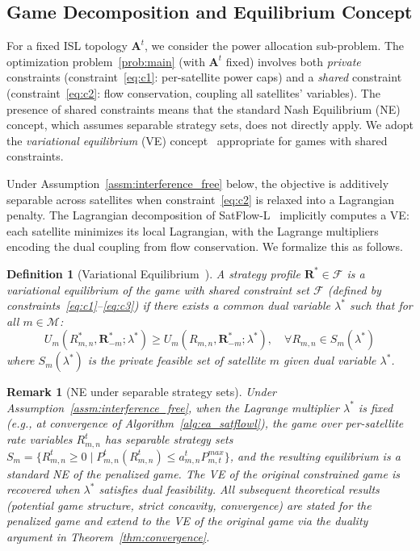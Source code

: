 \documentclass[journal]{IEEEtran}
\newtheorem{definition}{Definition}
\newtheorem{remark}{Remark}
\newcommand{\calM}{\mathcal{M}}
\newcommand{\bfR}{\mathbf{R}}
\newcommand{\Rmn}{R_{m,n}^{t}}
\begin{document}
\subsection{Game Decomposition and Equilibrium Concept}

For a fixed ISL topology $\mathbf{A}^t$, we consider the power allocation sub-problem. The optimization problem~\eqref{prob:main} (with $\mathbf{A}^t$ fixed) involves both \emph{private} constraints (constraint~\eqref{eq:c1}: per-satellite power caps) and a \emph{shared} constraint (constraint~\eqref{eq:c2}: flow conservation, coupling all satellites' variables). The presence of shared constraints means that the standard Nash Equilibrium (NE) concept, which assumes separable strategy sets, does not directly apply. We adopt the \emph{variational equilibrium} (VE) concept~\cite{facchinei2007vi} appropriate for games with shared constraints.

Under Assumption~\ref{assm:interference_free} below, the objective is additively separable across satellites when constraint~\eqref{eq:c2} is relaxed into a Lagrangian penalty. The Lagrangian decomposition of SatFlow-L~\cite{cen2024satflow} implicitly computes a VE: each satellite minimizes its local Lagrangian, with the Lagrange multipliers encoding the dual coupling from flow conservation. We formalize this as follows.

\begin{definition}[Variational Equilibrium~\cite{facchinei2007vi}]
\label{def:ve}
A strategy profile $\bfR^* \in \mathcal{F}$ is a
\emph{variational equilibrium} of the game with
shared constraint set $\mathcal{F}$ (defined by constraints~\eqref{eq:c1}--\eqref{eq:c3}) if there exists a common dual variable $\lambda^*$ such that for all $m\in\calM$:
\begin{equation}
    U_m(R_{m,n}^{*},\bfR_{-m}^*;\lambda^*)
    \geq U_m(R_{m,n},\bfR_{-m}^*;\lambda^*),
    \quad \forall R_{m,n}\in S_m(\lambda^*)
    \label{eq:ve_def}
\end{equation}
where $S_m(\lambda^*)$ is the private feasible set of satellite $m$ given dual variable $\lambda^*$.
\end{definition}

\begin{remark}[NE under separable strategy sets]
\label{rem:ne_ve}
Under Assumption~\ref{assm:interference_free}, when the Lagrange multiplier $\lambda^*$ is fixed (e.g., at convergence of Algorithm~\ref{alg:ea_satflowl}), the game over per-satellite rate variables $\Rmn$ has \emph{separable} strategy sets $S_m = \{R_{m,n}^t \geq 0 \mid P_{m,n}^t(R_{m,n}^t) \leq a_{m,n}^t P_{m,t}^{max}\}$, and the resulting equilibrium is a standard NE of the
\emph{penalized} game.
The VE of the original constrained game is recovered when $\lambda^*$ satisfies dual feasibility. All subsequent theoretical results (potential game structure, strict concavity, convergence) are stated for the penalized game and extend to the VE of the original game via the duality argument in Theorem~\ref{thm:convergence}.
\end{remark}
\end{document}
